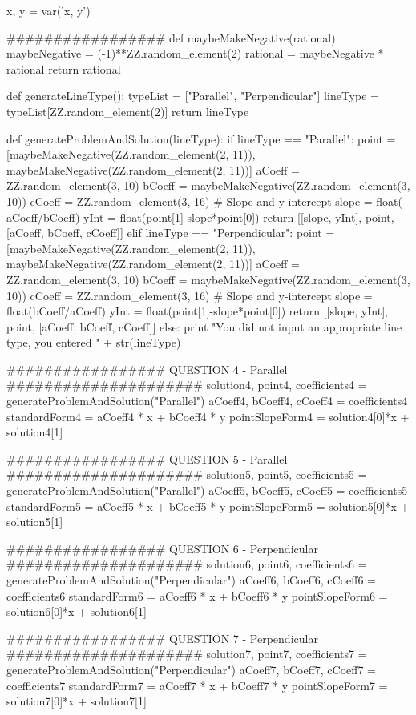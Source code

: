 \documentclass{ximera}
\begin{document}
\begin{sagesilent}
x, y = var('x, y')

#################
def maybeMakeNegative(rational):
    maybeNegative = (-1)**ZZ.random_element(2)
    rational = maybeNegative * rational
    return rational

def generateLineType():
    typeList = ["Parallel", "Perpendicular"]
    lineType = typeList[ZZ.random_element(2)]
    return lineType

def generateProblemAndSolution(lineType):
    if lineType == "Parallel":
        point = [maybeMakeNegative(ZZ.random_element(2, 11)), maybeMakeNegative(ZZ.random_element(2, 11))]
        aCoeff = ZZ.random_element(3, 10)
        bCoeff = maybeMakeNegative(ZZ.random_element(3, 10))
        cCoeff = ZZ.random_element(3, 16)
        # Slope and y-intercept
        slope = float(-aCoeff/bCoeff)
        yInt = float(point[1]-slope*point[0])
        return [[slope, yInt], point, [aCoeff, bCoeff, cCoeff]]
    elif lineType == "Perpendicular":
        point = [maybeMakeNegative(ZZ.random_element(2, 11)), maybeMakeNegative(ZZ.random_element(2, 11))]
        aCoeff = ZZ.random_element(3, 10)
        bCoeff = maybeMakeNegative(ZZ.random_element(3, 10))
        cCoeff = ZZ.random_element(3, 16)
        # Slope and y-intercept
        slope = float(bCoeff/aCoeff)
        yInt = float(point[1]-slope*point[0])
        return [[slope, yInt], point, [aCoeff, bCoeff, cCoeff]]
    else:
        print "You did not input an appropriate line type, you entered " + str(lineType)

################# QUESTION 4 - Parallel #####################
solution4, point4, coefficients4 = generateProblemAndSolution("Parallel")
aCoeff4, bCoeff4, cCoeff4 = coefficients4
standardForm4 = aCoeff4 * x + bCoeff4 * y
pointSlopeForm4 = solution4[0]*x + solution4[1]

################# QUESTION 5 - Parallel #####################
solution5, point5, coefficients5 = generateProblemAndSolution("Parallel")
aCoeff5, bCoeff5, cCoeff5 = coefficients5
standardForm5 = aCoeff5 * x + bCoeff5 * y
pointSlopeForm5 = solution5[0]*x + solution5[1]

################# QUESTION 6 - Perpendicular #####################
solution6, point6, coefficients6 = generateProblemAndSolution("Perpendicular")
aCoeff6, bCoeff6, cCoeff6 = coefficients6
standardForm6 = aCoeff6 * x + bCoeff6 * y
pointSlopeForm6 = solution6[0]*x + solution6[1]

################# QUESTION 7 - Perpendicular #####################
solution7, point7, coefficients7 = generateProblemAndSolution("Perpendicular")
aCoeff7, bCoeff7, cCoeff7 = coefficients7
standardForm7 = aCoeff7 * x + bCoeff7 * y
pointSlopeForm7 = solution7[0]*x + solution7[1]
\end{sagesilent}
\end{document}
